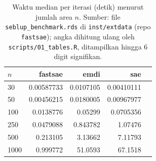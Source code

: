 \begin{table}[htbp]
\centering
\caption{Waktu median per iterasi (detik) menurut jumlah area $n$. Sumber: file \texttt{seblup\_benchmark.rds} di \texttt{inst/extdata} (repo \texttt{fastsae}); angka dihitung ulang oleh \texttt{scripts/01\_tables.R}, ditampilkan hingga 6 digit signifikan.}
\label{tab:time-sfh}
\small
\begin{tabular}{lrrrr}
\toprule
$n$ & fastsae & emdi & sae \\
\midrule
30 & 0.00587733 & 0.0107105 & 0.00410111 \\
50 & 0.00456215 & 0.0180005 & 0.00967977 \\
100 & 0.0138776 & 0.05299 & 0.0705356 \\
250 & 0.0479088 & 0.843782 & 1.07476 \\
500 & 0.213105 & 3.13662 & 7.11793 \\
1000 & 0.999772 & 51.0593 & 67.1518 \\
\bottomrule
\end{tabular}
\end{table}

